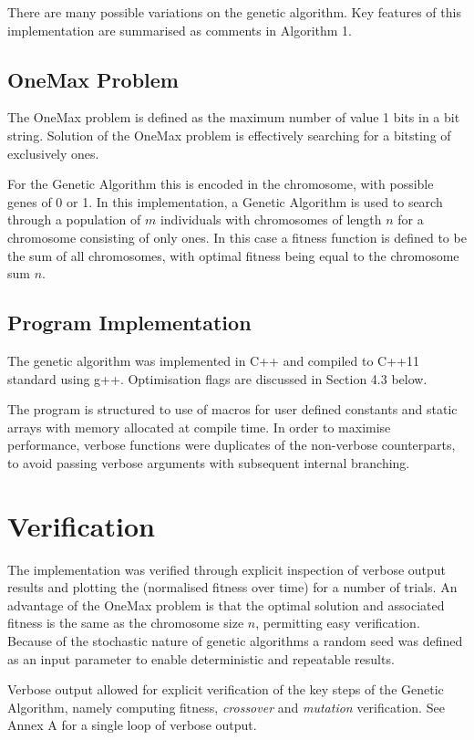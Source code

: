 \documentclass{article}
\begin{document}
There are many possible variations on the genetic algorithm. Key features of this implementation are summarised as comments in Algorithm 1.


\subsection{OneMax Problem}
The OneMax problem is defined as the maximum number of value 1 bits in a bit string. Solution of the OneMax problem is effectively searching for a bitsting of exclusively ones. 

For the Genetic Algorithm this is encoded in the chromosome, with possible genes of 0 or 1. In this implementation, a Genetic Algorithm is used to search through a population of \(m\) individuals with chromosomes of length \(n\) for a chromosome consisting of only ones. In this case a fitness function is defined to be the sum of all chromosomes, with optimal fitness being equal to the chromosome sum \(n\).

\subsection{Program Implementation}
The genetic algorithm was implemented in C++ and compiled to C++11 standard using g++. Optimisation flags are discussed in Section 4.3 below.

The program is structured to use of macros for user defined constants and static arrays with memory allocated at compile time. In order to maximise performance, verbose functions were duplicates of the non-verbose counterparts, to avoid passing verbose arguments with subsequent internal branching. 

\section{Verification}
The implementation was verified through explicit inspection of verbose output results and plotting the (normalised fitness over time) for a number of trials. An advantage of the OneMax problem is that the optimal solution and associated fitness is the same as the chromosome size \(n\), permitting easy verification.  Because of the stochastic nature of genetic algorithms a  random seed was defined as an input parameter to enable deterministic and repeatable results.

Verbose output allowed for explicit verification of the key steps of the Genetic Algorithm, namely computing fitness, \textit{crossover} and \textit{mutation} verification. See Annex A for a single loop of verbose output.
\end{document}
